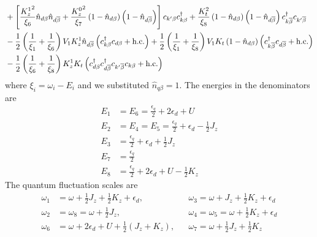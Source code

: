 \documentclass[12pt,twoside]{article}
\numberwithin{equation}{section}
\begin{document}
{\begin{equation}
\begin{aligned}
&+ \left[\frac{{K_z^1}^2}{\xi_6}\hat n_{d\beta}\hat n_{d\overline\beta} + \frac{{K_z^0}^2}{\xi_7}\left(1 - \hat n_{d\beta}\right)\left(1 - \hat n_{d\overline\beta}\right)\right]c_{k^\prime\beta}c^\dagger_{k\beta} + \frac{K_t^2}{\xi_8}\left(1 - \hat n_{d\beta}\right)\left(1 - \hat n_{d\overline\beta}\right)c^\dagger_{k\overline\beta}c_{k^\prime\overline\beta}\\
&- \frac{1}{2}\left(\frac{1}{\xi_1} + \frac{1}{\xi_6} \right)V_1 K_z^1 \hat n_{d\overline\beta}\left(c^\dagger_{k\beta}c_{d\beta} + \text{h.c.}\right) + \frac{1}{2}\left(\frac{1}{\xi_1} + \frac{1}{\xi_8} \right)V_1 K_t \left(1 - \hat n_{d\beta}\right)\left(c^\dagger_{k\overline\beta}c_{d\overline\beta} + \text{h.c.}\right)\\
&- \frac{1}{2}\left(\frac{1}{\xi_6} + \frac{1}{\xi_8} \right)K_z^1 K_t \left(c^\dagger_{d\beta}c^\dagger_{d\overline\beta}c_{k^\prime\overline\beta}c_{k\beta} + \text{h.c.}\right)
\end{aligned}\end{equation}
where \(\xi_i = \omega_i - E_i\) and we substituted \(\hat n_{q\beta}=1\). The energies in the denominators are
\begin{equation}\begin{aligned}
	E_1 &= E_6 = \frac{\epsilon_q}{2} + 2\epsilon_d+ U\\
	E_2 &= E_4 = E_5 = \frac{\epsilon_q}{2} + \epsilon_d - \frac{1}{2}J_z\\
	E_3 &= \frac{\epsilon_q}{2} + \epsilon_d + \frac{1}{2}J_z\\
	E_7 &= \frac{\epsilon_q}{2}\\
	E_8 &= \frac{\epsilon_q}{2} + 2\epsilon_d+ U - \frac{1}{2}K_z
\end{aligned}\end{equation}
The quantum fluctuation scales are
\begin{equation}\begin{aligned}
	\omega_1&=\omega+\frac{1}{2}J_z+\frac{1}{2}K_z+\epsilon_d, &&\omega_3=\omega+J_z+\frac{1}{2}K_z+\epsilon_d\\
\omega_2& = \omega_8 = \omega+\frac{1}{2}J_z, &&\omega_4= \omega_5 = \omega+\frac{1}{2}K_z+\epsilon_d\\
\omega_6&=\omega+2\epsilon_d+U+\frac{1}{2}\left(J_z+K_z\right), &&\omega_7=\omega+\frac{1}{2}J_z+\frac{1}{2}K_z\\
\end{aligned}\end{equation}
}
\end{document}
